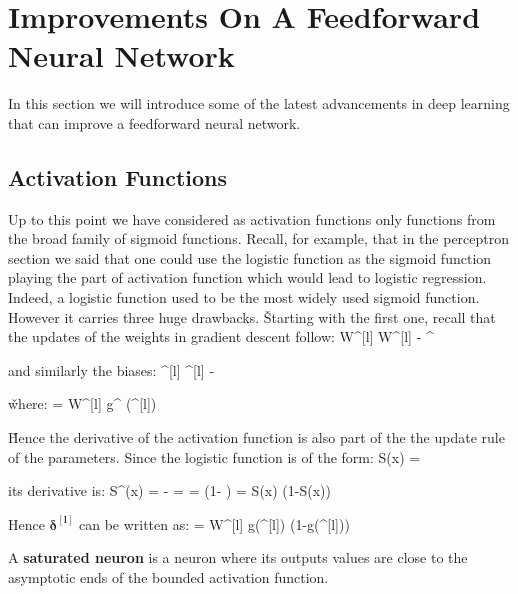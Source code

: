 \section{Improvements On A Feedforward Neural Network}

In this section we will introduce some of the latest advancements in deep learning that can improve a feedforward 
neural network.

\subsection{Activation Functions}

Up to this point we have considered as activation functions only functions from the broad family of sigmoid functions.
Recall, for example, that in the perceptron section we said that one could use the logistic function as the sigmoid
function playing the part of activation function which would lead to logistic regression. Indeed, a logistic function
used to be the most widely used sigmoid function. However it carries three huge drawbacks. \v

Starting with the first one, recall that the updates of the weights in gradient descent follow:
\bse
W^{[l]} \coloneqq W^{[l]} - \alpha \cdot\boldsymbol{\delta^{[l]}} ^{\intercal}
\ese

and similarly the biases:
\bse
{}^{[l]} \coloneqq {}^{[l]} - \alpha \cdot \boldsymbol{\delta^{[l]}}
\ese

\v

where:
\bse
\boldsymbol{\delta^{[l]}} = \boldsymbol{\delta^{[l+1]}} \cdot W^{[l]} \cdot g^{\prime} ({}^{[l]})
\ese

\v

Hence the derivative of the activation function is also part of the the update rule of the parameters. Since the 
logistic function is of the form:
\bse
S(x) = 
\ese

its derivative is:
\bse
S^{\prime}(x) = -  =  \cdot {} 
=  \cdot \left(1- \right) = S(x) \cdot (1-S(x))
\ese

Hence $\boldsymbol{\delta^{[l]}}$ can be written as:
\bse
\boldsymbol{\delta^{[l]}} = \boldsymbol{\delta^{[l+1]}} \cdot W^{[l]} 
\cdot g({}^{[l]}) \cdot (1-g({}^{[l]}))
\ese

A \textbf{saturated neuron} is a neuron where its outputs values are close to the asymptotic ends of the bounded 
activation function. 
\ed

